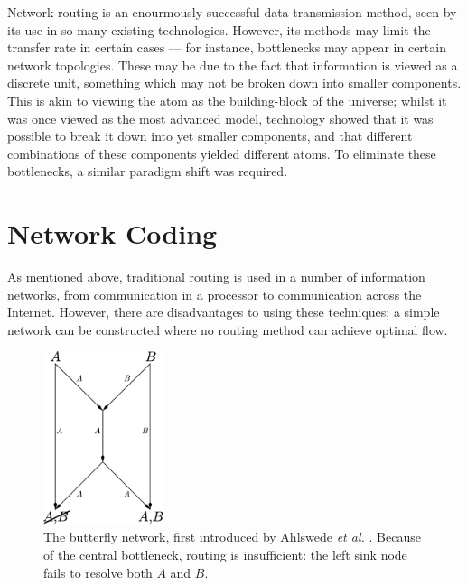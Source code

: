 Network routing is an enourmously successful data transmission method, seen by its use in so many existing technologies. However, its methods may limit the transfer rate in certain cases --- for instance, bottlenecks may appear in certain network topologies. These may be due to the fact that information is viewed as a discrete unit, something which may not be broken down into smaller components. This is akin to viewing the atom as the building-block of the universe; whilst it was once viewed as the most advanced model, technology showed that it was possible to break it down into yet smaller components, and that different combinations of these components yielded different atoms. To eliminate these bottlenecks, a similar paradigm shift was required.

\section{Network Coding}
\label{sect:netcod}

As mentioned above, traditional routing is used in a number of information networks, from communication in a processor to communication across the Internet. However, there are disadvantages to using these techniques; a simple network can be constructed where no routing method can achieve optimal flow.

\begin{figure}[ht]
	\centering
	\includegraphics[width=100pt]{figures/butterfly.pdf}
	\caption[The butterfly network using routing]{The butterfly network, first introduced by Ahlswede \textit{et al.} \cite{ahls2000}. Because of the central bottleneck, routing is insufficient: the left sink node fails to resolve both $A$ and $B$.}
	\label{butterfly}
\end{figure}


